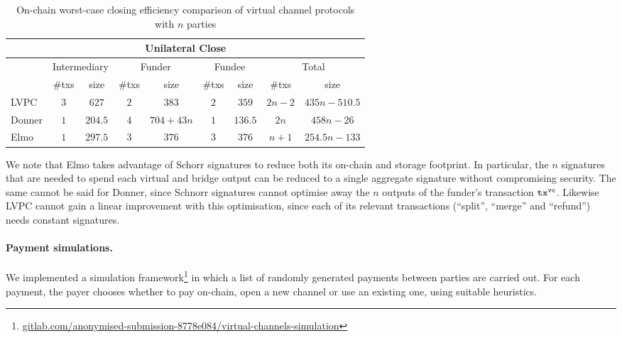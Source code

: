   \begin{table}[h!]
    \begin{minipage}{\textwidth}
    \centering
    \begin{tabular}{|l|c|c|c|c|c|c|c|c|}
    \hline
    \multicolumn{9}{|c|}{Unilateral Close} \\
    \hline
              & \multicolumn{2}{|c|}{Intermediary}
              & \multicolumn{2}{|c|}{Funder} & \multicolumn{2}{|c|}{Fundee}
              & \multicolumn{2}{|c|}{Total} \\
    \hline
              & \#txs & size & \#txs & size & \#txs & size & \#txs & size \\
    \hline
    LVPC      & $3$ & $627$ & $2$ & $383$ & $2$ & $359$ & $2n-2$ & $435n -
              510.5$ \\
    \hline
    Donner    & $1$ & $204.5$ & $4$ & $704 + 43n$ & $1$ & $136.5$ & $2n$ & $458n
              - 26$ \\
    \hline
    Elmo      & $1$ & $297.5$ & $3$ & $376$ & $3$ & $376$
              & $n+1$ & $254.5n-133$ \\
    \hline
    \end{tabular}
    \end{minipage}
    \caption{On-chain worst-case closing efficiency comparison of virtual
    channel protocols with $n$ parties}
    \label{table:comparison:overhead:n-parties:close}
  \end{table}

  We note that Elmo takes advantage of Schorr signatures to reduce both its
  on-chain and storage footprint. In particular, the $n$ signatures that are
  needed to spend each virtual and bridge output can be reduced to a single
  aggregate signature without compromising security. The same cannot be said for
  Donner, since Schnorr signatures cannot optimise away the $n$ outputs of the
  funder's transaction $\texttt{tx}^{\mathtt{vc}}$. Likewise LVPC cannot gain a linear
  improvement with this optimisation, since each of its relevant transactions
  (``split'', ``merge'' and ``refund'') needs constant signatures.

  \paragraph{Payment simulations.} We implemented a simulation
  framework\footnote{\url{gitlab.com/anonymised-submission-8778e084/virtual-channels-simulation}}
  in which a list of randomly generated payments between parties are carried
  out. For each payment, the payer chooses whether to pay on-chain,
  open a new channel or use an existing one, using suitable heuristics.

